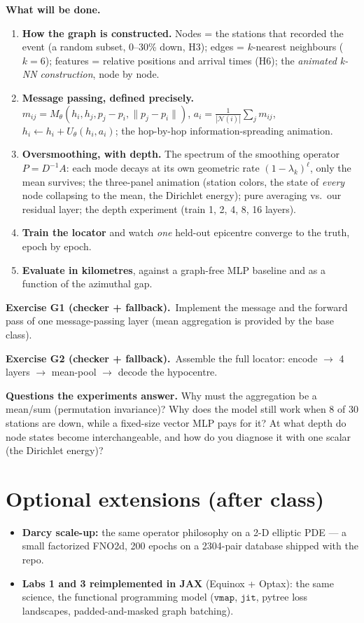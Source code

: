 \documentclass[11pt,a4paper]{article}
\newcommand{\exo}[2]{\medskip\noindent\textbf{Exercise #1 (#2).}\ }
\begin{document}
\textbf{What will be done.}
\begin{enumerate}[leftmargin=*,itemsep=1pt]
\item \textbf{How the graph is constructed.} Nodes = the stations that recorded the event
(a random subset, 0--30\% down, H3); edges = $k$-nearest neighbours ($k{=}6$); features = relative
positions and arrival times (H6); the \emph{animated k-NN construction}, node by node.
\item \textbf{Message passing, defined precisely.}
$m_{ij}=M_\theta(h_i,h_j,p_j-p_i,\lVert p_j-p_i\rVert)$,
$a_i=\frac{1}{|\mathcal N(i)|}\sum_{j}m_{ij}$, $h_i\leftarrow h_i+U_\theta(h_i,a_i)$;
the hop-by-hop information-spreading animation.
\item \textbf{Oversmoothing, with depth.} The spectrum of the smoothing operator $P=D^{-1}A$:
each mode decays at its own geometric rate $(1-\lambda_k)^\ell$, only the mean survives; the
three-panel animation (station colors, the state of \emph{every} node collapsing to the mean, the
Dirichlet energy); pure averaging vs.\ our residual layer; the depth experiment (train 1, 2, 4,
8, 16 layers).
\item \textbf{Train the locator} and watch \emph{one} held-out epicentre converge to the truth,
epoch by epoch.
\item \textbf{Evaluate in kilometres}, against a graph-free MLP baseline and as a function of
the azimuthal gap.
\end{enumerate}

\exo{G1}{checker + fallback}Implement the message and the forward pass of one
message-passing layer (mean aggregation is provided by the base class).
\par\exo{G2}{checker + fallback}Assemble the full locator: encode $\rightarrow$ 4 layers $\rightarrow$
mean-pool $\rightarrow$ decode the hypocentre.

\textbf{Questions the experiments answer.} Why must the aggregation be a mean/sum (permutation
invariance)? Why does the model still work when 8 of 30 stations are down, while a fixed-size
vector MLP pays for it? At what depth do node states become interchangeable, and how do you
diagnose it with one scalar (the Dirichlet energy)?

\section*{Optional extensions (after class)}
\begin{itemize}[leftmargin=*,itemsep=1pt]
\item \textbf{Darcy scale-up:} the same operator philosophy on a 2-D elliptic PDE --- a small
factorized FNO2d, 200 epochs on a 2304-pair database shipped with the repo.
\item \textbf{Labs 1 and 3 reimplemented in JAX} (Equinox + Optax): the same science, the
functional programming model ($\texttt{vmap}$, $\texttt{jit}$, pytree loss landscapes,
padded-and-masked graph batching).
\end{itemize}
\end{document}
